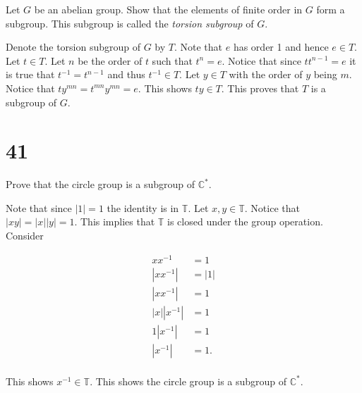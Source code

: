 \documentclass[a4paper]{article}
\begin{document}
Let $G$ be an abelian group. Show that the elements of finite order in $G$ form a subgroup. This subgroup is called the \textit{torsion subgroup} of $G$.

\vspace{\baselineskip}

Denote the torsion subgroup of $G$ by $T$. Note that $e$ has order 1 and hence $e \in T$. Let $t \in T$. Let $n$ be the order of $t$ such that $t^n = e$. Notice that since $tt^{n-1} = e$ it is true that $t^{-1} = t^{n-1}$ and thus $t^{-1} \in T$. Let $y \in T$ with the order of $y$ being $m$. Notice that $ty^{mn} = t^{mn}y^{mn} = e$. This shows $ty \in T$. This proves that $T$ is a subgroup of $G$. 


\section*{41}

Prove that the circle group is a subgroup of $\mathbb{C}^*$.

\vspace{\baselineskip}

Note that since $|1| = 1$ the identity is in $\mathbb{T}$. Let $x,y \in \mathbb{T}$. Notice that $|xy| = |x||y| = 1$. This implies that $\mathbb{T}$ is closed under the group operation. Consider 

\begin{align*}
x x^{-1} &= 1 \\
|x x ^{-1}| &= |1| \\
|x x ^{-1}| &= 1 \\
|x| |x ^{-1}| &= 1 \\
1 | x ^{-1}| &= 1 \\
|x ^{-1}| &= 1 .\\
\end{align*}

This shows $x^{-1} \in \mathbb{T}$. This shows the circle group is a subgroup of $\mathbb{C}^*$.
\end{document}

